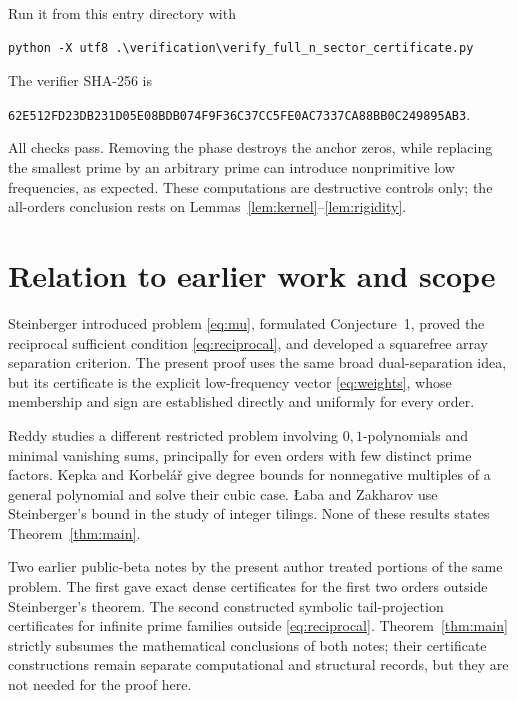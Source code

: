 \documentclass[11pt]{article}
\numberwithin{equation}{section}
\begin{document}
Run it from this entry directory with
\begin{Verbatim}[fontsize=\footnotesize]
python -X utf8 .\verification\verify_full_n_sector_certificate.py
\end{Verbatim}
The verifier SHA-256 is
\begin{center}
\small\texttt{62E512FD23DB231D05E08BDB074F9F36C37CC5FE0AC7337CA88BB0C249895AB3}.
\end{center}
All checks pass. Removing the phase destroys the anchor zeros, while replacing
the smallest prime by an arbitrary prime can introduce nonprimitive low
frequencies, as expected. These computations are destructive controls only;
the all-orders conclusion rests on Lemmas~\ref{lem:kernel}--\ref{lem:rigidity}.

\section{Relation to earlier work and scope}\label{sec:scope}

Steinberger \cite{steinberger2012} introduced problem \eqref{eq:mu},
formulated Conjecture~1, proved the reciprocal sufficient condition
\eqref{eq:reciprocal}, and developed a squarefree array separation criterion.
The present proof uses the same broad dual-separation idea, but its certificate
is the explicit low-frequency vector \eqref{eq:weights}, whose membership and
sign are established directly and uniformly for every order.

Reddy \cite{reddy2011} studies a different restricted problem involving
$0,1$-polynomials and minimal vanishing sums, principally for even orders with
few distinct prime factors. Kepka and Korbel\'a\v{r} \cite{kepka2012} give degree
bounds for nonnegative multiples of a general polynomial and solve their cubic
case. {\L}aba and Zakharov \cite{laba2025} use Steinberger's bound in the study of
integer tilings. None of these results states Theorem~\ref{thm:main}.

Two earlier public-beta notes by the present author treated portions of the
same problem. The first \cite{carptopus-fixed} gave exact dense certificates
for the first two orders outside Steinberger's theorem. The second
\cite{carptopus-tail} constructed symbolic tail-projection certificates for
infinite prime families outside \eqref{eq:reciprocal}. Theorem~\ref{thm:main}
strictly subsumes the mathematical conclusions of both notes; their
certificate constructions remain separate computational and structural
records, but they are not needed for the proof here.
\end{document}

